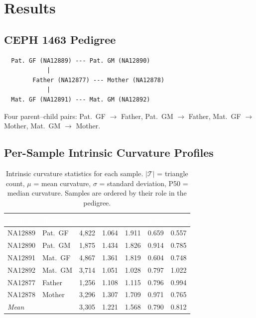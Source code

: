 \documentclass{../yalumba}
\begin{document}
\section{Results}
\label{sec:results}

\subsection{CEPH 1463 Pedigree}

\begin{pedigree}
\begin{verbatim}
  Pat. GF (NA12889) --- Pat. GM (NA12890)
            |
        Father (NA12877) --- Mother (NA12878)
            |
  Mat. GF (NA12891) --- Mat. GM (NA12892)
\end{verbatim}
Four parent--child pairs:
Pat.~GF $\to$ Father, Pat.~GM $\to$ Father,
Mat.~GF $\to$ Mother, Mat.~GM $\to$ Mother.
\end{pedigree}

\subsection{Per-Sample Intrinsic Curvature Profiles}

\begin{table}[H]
  \centering
  \tablestyle
  \caption{Intrinsic curvature statistics for each sample.  $|\mathcal{T}|$
    = triangle count, $\mu$ = mean curvature, $\sigma$ = standard deviation,
    P50 = median curvature.  Samples are ordered by their role in the pedigree.}
  \label{tab:persample}
  \begin{tabular}{llrcccc}
    \toprule
    \rowcolor{table-header}
    \textcolor{white}{\textbf{Sample}} &
    \textcolor{white}{\textbf{Relation}} &
    \textcolor{white}{\textbf{$|\mathcal{T}|$}} &
    \textcolor{white}{\textbf{$\mu$}} &
    \textcolor{white}{\textbf{$\sigma$}} &
    \textcolor{white}{\textbf{P50}} &
    \textcolor{white}{\textbf{$\mu/\sigma$}} \\
    \midrule
    NA12889 & Pat.~GF & 4{,}822 & 1.064 & 1.911 & 0.659 & 0.557 \\
    NA12890 & Pat.~GM & 1{,}875 & 1.434 & 1.826 & 0.914 & 0.785 \\
    NA12891 & Mat.~GF & 4{,}867 & 1.361 & 1.819 & 0.604 & 0.748 \\
    NA12892 & Mat.~GM & 3{,}714 & 1.051 & 1.028 & 0.797 & 1.022 \\
    NA12877 & Father  & 1{,}256 & 1.108 & 1.115 & 0.796 & 0.994 \\
    NA12878 & Mother  & 3{,}296 & 1.307 & 1.709 & 0.971 & 0.765 \\
    \midrule
    \multicolumn{2}{l}{\textit{Mean}} & 3{,}305 & 1.221 & 1.568 & 0.790
      & 0.812 \\
    \bottomrule
  \end{tabular}
\end{table}
\end{document}
